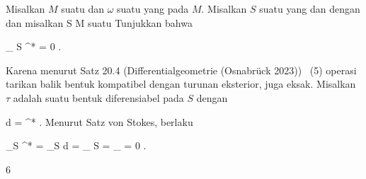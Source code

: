 {

Misalkan $M$ suatu
dan $\omega$ suatu
yang
pada $M$. Misalkan $S$ suatu
yang
dan
 {} {}
dengan
dan misalkan
\maabbdisp {\varphi} { S } { M
} {}
suatu
Tunjukkan bahwa

\mavergleichskettedisp
{\vergleichskette
{
\int_{  S  }   \varphi^*\omega
}
{ =} { 0
}
{ } {
}
{ } {
}
{ } {
}
}
{}{}{.}

}
{

Karena menurut
Satz 20.4 (Differentialgeometrie (Osnabrück 2023))  (5)
operasi tarikan balik bentuk kompatibel dengan turunan eksterior,
\mathl{\varphi^*\omega}{} juga eksak. Misalkan $\tau$ adalah suatu bentuk diferensiabel pada $S$ dengan

\mavergleichskettedisp
{\vergleichskette
{d \tau
}
{ =} { \varphi^* \omega
}
{ } {
}
{ } {
}
{ } {
}
}
{}{}{.}
Menurut
Satz von Stokes,
berlaku

\mavergleichskettedisp
{\vergleichskette
{ \int_S \varphi^* \omega
}
{ =} { \int_S d \tau
}
{ =} { \int_{ \partial S } \tau
}
{ =} { \int_\emptyset \tau
}
{ =} { 0
}
}
{}{}{.}

 }



{6}

